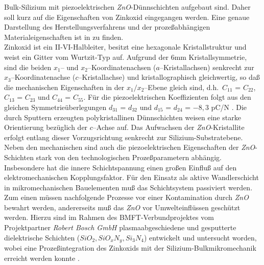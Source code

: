 Bulk-Silizium mit piezoelektrischen {\em ZnO}-Dünnschichten aufgebaut sind.
Daher soll kurz auf die Eigenschaften von Zinkoxid eingegangen werden.
Eine genaue Darstellung des Herstellungsverfahrens und der prozeßabhängigen
Materialeigenschaften ist in \cite{Wag94} zu finden. \\
%
Zinkoxid ist ein II-VI-Halbleiter, besitzt eine hexagonale Kristallstruktur
und weist ein Gitter vom Wurtzit-Typ auf. Aufgrund der 6mm Kristallsymmetrie,
sind die beiden $x_{1}$-- und $x_{2}$--Koordinatenachsen
($a$--Kristallachsen) senkrecht zur $x_{3}$--Koordinatenachse
($c$--Kristallachse) und kristallographisch gleichwertig, so daß die
mechanischen Eigenschaften in der $x_{1}/x_{2}$--Ebene gleich sind, d.h.\
$C_{11}$ = $C_{22}$, $C_{13}$ = $C_{23}$ und $C_{44}$ = $C_{55}$.
Für die piezoelektrischen Koeffizienten folgt aus den gleichen
Symmetrieüberlegungen $d_{31}$ = $d_{32}$ und
$d_{15}$ = $d_{24}$ = $-8,3$ pC/N \cite{LB82}. Die durch Sputtern
erzeugten polykristallinen Dünnschichten weisen eine starke Orientierung
bezüglich der $c$--Achse auf. Das Aufwachsen der {\em ZnO}-Kristallite
erfolgt entlang dieser Vorzugsrichtung senkrecht zur Silizium-Substratebene.
Neben den mechanischen sind auch die piezoelektrischen Eigenschaften der
{\em ZnO}-Schichten stark von den technologischen Prozeßparametern abhängig.
Insbesondere hat die innere Schichtspannung einen großen Einfluß auf den
elektromechanischen Kopplungsfaktor. Für den
Einsatz als aktive Wandlerschicht in mikromechanischen Bauelementen muß
das Schichtsystem passiviert werden.  Zum einen müssen nachfolgende
Prozesse vor einer Kontamination durch {\em ZnO} bewahrt werden, andererseits
muß das {\em ZnO} vor Umwelteinflüssen geschützt werden.  Hierzu sind im
Rahmen des BMFT-Verbundprojektes vom Projektpartner {\em Robert Bosch GmbH}
plasmaabgeschiedene und gesputterte dielektrische Schichten ($ SiO_{2},
SiO_{x}N_{y}, Si_{3}N_{4} $) entwickelt und untersucht worden, wobei
eine Prozeßintegration des Zinkoxids mit der Silizium-Bulkmikromechanik
erreicht werden konnte \cite{ABV93}.

